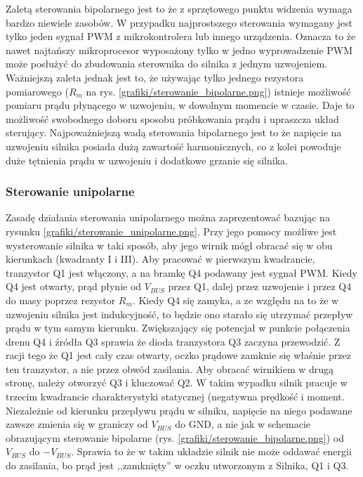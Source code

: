 Zaletą sterowania bipolarnego jest to że z sprzętowego punktu widzenia wymaga bardzo niewiele zasobów. W przypadku najprostszego sterowania wymagany jest tylko jeden sygnał PWM z mikrokontrolera lub innego urządzenia. Oznacza to że nawet najtańszy mikroprocesor wyposażony tylko w jedno wyprowadzenie PWM może posłużyć do zbudowania sterownika do silnika z jednym uzwojeniem. Ważniejszą zaleta jednak jest to, że używając tylko jednego rezystora pomiarowego ($ R_m $ na rys. \ref{grafiki/sterowanie_bipolarne.png}) istnieje możliwość pomiaru prądu płynącego w uzwojeniu, w dowolnym momencie w czasie. Daje to możliwość swobodnego doboru sposobu próbkowania prądu i upraszcza układ sterujący. Najpoważniejszą wadą sterowania bipolarnego jest to że napięcie na uzwojeniu silnika posiada dużą zawartość harmonicznych, co z kolei powoduje duże tętnienia prądu w uzwojeniu i dodatkowe grzanie się silnika.

\subsubsection{Sterowanie unipolarne}

Zasadę działania sterowania unipolarnego można zaprezentować bazując na rysunku \ref{grafiki/sterowanie_unipolarne.png}. Przy jego pomocy możliwe jest wysterowanie silnika w taki sposób, aby jego wirnik mógł obracać się w obu kierunkach (kwadranty I i III). Aby pracować w pierwszym kwadrancie, tranzystor Q1 jest włączony, a na bramkę Q4 podawany jest sygnał PWM. Kiedy Q4 jest otwarty, prąd płynie od $ V_{BUS} $ przez Q1, dalej przez uzwojenie i przez Q4 do masy poprzez rezystor $ R_m $. Kiedy Q4 się zamyka, a ze względu na to że w uzwojeniu silnika jest indukcyjność, to będzie ono starało się utrzymać przepływ prądu w tym samym kierunku. Zwiększający się potencjał w punkcie połączenia drenu Q4 i źródła Q3 sprawia że dioda tranzystora Q3 zaczyna przewodzić. Z racji tego że Q1 jest cały czas otwarty, oczko prądowe zamknie się właśnie przez ten tranzystor, a nie przez obwód zasilania. Aby obracać wirnikiem w drugą stronę, należy otworzyć Q3 i kluczować Q2. W takim wypadku silnik pracuje w trzecim kwadrancie charakterystyki statycznej (negatywna prędkość i moment. Niezależnie od kierunku przepływu prądu w silniku, napięcie na niego podawane zawsze zmienia się w graniczy od $ V_{BUS} $ do GND, a nie jak w schemacie obrazującym sterowanie bipolarne (rys. \ref{grafiki/sterowanie_bipolarne.png}) od $ V_{BUS} $ do $ -V_{BUS} $. Sprawia to że w takim układzie silnik nie może oddawać energii do zasilania, bo prąd jest ,,zamknięty'' w oczku utworzonym z Silnika, Q1 i Q3. 

